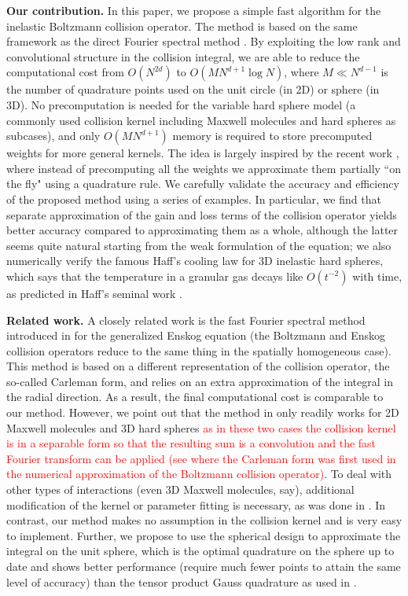 \documentclass[review,times]{elsarticle}
\begin{document}
{\bf Our contribution.} In this paper, we propose a simple fast algorithm for the inelastic Boltzmann collision operator. The method is based on the same framework as the direct Fourier spectral method \cite{FPT05}. By exploiting the low rank and convolutional structure in the collision integral, we are able to reduce the computational cost from $O(N^{2d})$ to $O(MN^{d+1}\log N)$, where $M \ll N^{d-1}$ is the number of quadrature points used on the unit circle (in 2D) or sphere (in 3D). No precomputation is needed for the variable hard sphere model (a commonly used collision kernel including Maxwell molecules and hard spheres as subcases), and only $O(MN^{d+1})$ memory is required to store precomputed weights for more general kernels. The idea is largely inspired by the recent work \cite{GHHH17}, where instead of precomputing all the weights we approximate them partially ``on the fly" using a quadrature rule. We carefully validate the accuracy and efficiency of the proposed method using a series of examples. In particular, we find that separate approximation of the gain and loss terms of the collision operator yields better accuracy compared to approximating them as a whole, although the latter seems quite natural starting from the weak formulation of the equation; we also numerically verify the famous Haff's cooling law for 3D inelastic hard spheres, which says that the temperature in a granular gas decays like $O(t^{-2})$ with time, as predicted in Haff's seminal work \cite{Haff83}.

{\bf Related work.} A closely related work is the fast Fourier spectral method introduced in \cite{WZR15} for the generalized Enskog equation (the Boltzmann and Enskog collision operators reduce to the same thing in the spatially homogeneous case). This method is based on a different representation of the collision operator, the so-called Carleman form, and relies on an extra approximation of the integral in the radial direction. As a result, the final computational cost is comparable to our method. However, we point out that the method in \cite{WZR15} only readily works for 2D Maxwell molecules and 3D hard spheres \textcolor{red}{as in these two cases the collision kernel is in a separable form so that the resulting sum is a convolution and the fast Fourier transform can be applied (see \cite{MP06} where the Carleman form was first used in the numerical approximation of the Boltzmann collision operator)}. To deal with other types of interactions (even 3D Maxwell molecules, say), additional modification of the kernel or parameter fitting is necessary, as was done in \cite{WWSRZ13}. In contrast, our method makes no assumption in the collision kernel and is very easy to implement. Further, we propose to use the spherical design \cite{Womersley} to approximate the integral on the unit sphere, which is the optimal quadrature on the sphere up to date and shows better performance (require much fewer points to attain the same level of accuracy) than the tensor product Gauss quadrature as used in \cite{WZR15}.
\end{document}
